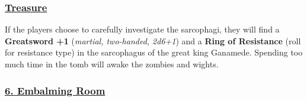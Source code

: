 \begin{multicols*}{2}
\subsubsection*{\underline{\textbf{Treasure}}}
If the players choose to carefully investigate the sarcophagi, they will find a \textbf{Greatsword +1} (\emph{martial, two-handed, 2d6+1}) and a \textbf{Ring of Resistance} (roll for resistance type) in the sarcophagus of the great king Ganamede. Spending too much time in the tomb will awake the zombies and wights.

\subsubsection*{\underline{6. Embalming Room}}

 
\end{multicols*}


\pagebreak
